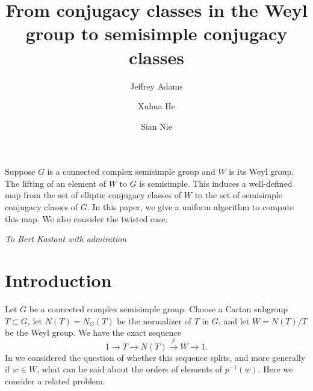 \documentclass[10pt,leqno]{article}
\renewcommand{\sec}[1]{\section{#1}
\renewcommand{\theequation}{\thesection.\arabic{equation}}
  \setcounter{equation}{0}}
\newcommand\inv{^{-1}}
\renewcommand{\sec}[1]{\section{#1}
\renewcommand{\theequation}{\thesection.\arabic{equation}}
  \setcounter{equation}{0}}
\begin{document}
\author{Jeffrey Adams}
\author{Xuhua He}
\author{Sian Nie}
\date{}                     %


\title{From conjugacy classes in  the Weyl group to semisimple conjugacy classes}


\maketitle

\let\thefootnote\relax{}

\let\thefootnote\relax{}

\let\thefootnote\relax{}

 Suppose $G$ is a connected complex semisimple group
and $W$ is its Weyl group. The lifting of an element of $W$ to $G$ is
semisimple. This induces a well-defined map from the set of elliptic
conjugacy classes of $W$ to the set of semisimple conjugacy classes of
$G$. In this paper, we give a uniform algorithm to compute this
map. We also consider the twisted case.

\begin{center}

  
  \large \emph{To Bert Kostant with admiration}
  \end{center}

\sec{Introduction}

Let $G$ be a connected complex semisimple group.
Choose a Cartan subgroup $T\subset G$, let $N(T)=N_G(T)$ be the normalizer of $T$ in $G$,
and let $W=N(T)/T$ be the Weyl group.
We have the exact sequence
\begin{equation}
\label{e:exactW}
1\rightarrow T\rightarrow N(T)\overset p\rightarrow W\rightarrow 1.
\end{equation}
In \cite{AH} we considered the question of whether this sequence splits,
and more generally if $w\in W$, what can be said about the orders of elements of $p\inv(w)$.
Here we consider a related problem.
\end{document}
